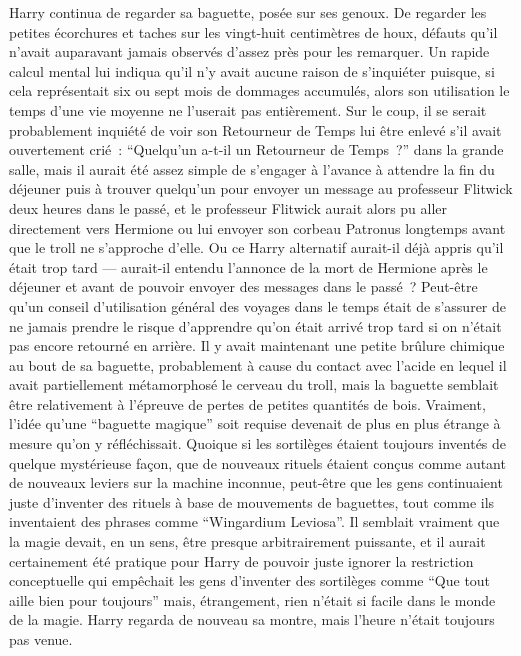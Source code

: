Harry continua de regarder sa baguette, posée sur ses genoux. De regarder les petites écorchures et taches sur les vingt-huit centimètres de houx, défauts qu'il n'avait auparavant jamais observés d'assez près pour les remarquer. Un rapide calcul mental lui indiqua qu'il n'y avait aucune raison de s'inquiéter puisque, si cela représentait six ou sept mois de dommages accumulés, alors son utilisation le temps d'une vie moyenne ne l'userait pas entièrement. Sur le coup, il se serait probablement inquiété de voir son Retourneur de Temps lui être enlevé s'il avait ouvertement crié~: “Quelqu'un a-t-il un Retourneur de Temps~?” dans la grande salle, mais il aurait été assez simple de s'engager à l'avance à attendre la fin du déjeuner puis à trouver quelqu'un pour envoyer un message au professeur Flitwick deux heures dans le passé, et le professeur Flitwick aurait alors pu aller directement vers Hermione ou lui envoyer son corbeau Patronus longtemps avant que le troll ne s'approche d'elle. Ou ce Harry alternatif aurait-il déjà appris qu'il était trop tard — aurait-il entendu l'annonce de la mort de Hermione après le déjeuner et avant de pouvoir envoyer des messages dans le passé~? Peut-être qu'un conseil d'utilisation général des voyages dans le temps était de s'assurer de ne jamais prendre le risque d'apprendre qu'on était arrivé trop tard si on n'était pas encore retourné en arrière. Il y avait maintenant une petite brûlure chimique au bout de sa baguette, probablement à cause du contact avec l'acide en lequel il avait partiellement métamorphosé le cerveau du troll, mais la baguette semblait être relativement à l'épreuve de pertes de petites quantités de bois. Vraiment, l'idée qu'une “baguette magique” soit requise devenait de plus en plus étrange à mesure qu'on y réfléchissait. Quoique si les sortilèges étaient toujours inventés de quelque mystérieuse façon, que de nouveaux rituels étaient conçus comme autant de nouveaux leviers sur la machine inconnue, peut-être que les gens continuaient juste d'inventer des rituels à base de mouvements de baguettes, tout comme ils inventaient des phrases comme “Wingardium Leviosa”. Il semblait vraiment que la magie devait, en un sens, être presque arbitrairement puissante, et il aurait certainement été pratique pour Harry de pouvoir juste ignorer la restriction conceptuelle qui empêchait les gens d'inventer des sortilèges comme “Que tout aille bien pour toujours” mais, étrangement, rien n'était si facile dans le monde de la magie. Harry regarda de nouveau sa montre, mais l'heure n'était toujours pas venue.

